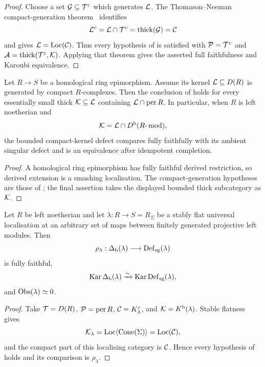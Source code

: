 \begin{proof}
Choose a set \(\mathcal G\subseteq\mathcal T^c\) which generates \(\mathcal L\).  The Thomason--Neeman compact-generation theorem~\cite[Theorem~4.4.9]{Neeman01} identifies
\[
 \mathcal L^c=\mathcal L\cap\mathcal T^c=\operatorname{thick}(\mathcal G)=\mathcal C
\]
and gives \(\mathcal L=\operatorname{Loc}(\mathcal C)\).  Thus every hypothesis of  is satisfied with \(\mathcal P=\mathcal T^c\) and \(\mathcal A=\operatorname{thick}(\mathcal T^c,\mathcal K)\).  Applying that theorem gives the asserted full faithfulness and Karoubi equivalence.
\end{proof}

\begin{corollary}\label{cor:homological-epi-compact-kernel}
Let \(R\to S\) be a homological ring epimorphism.  Assume its kernel \(\mathcal L\subseteq D(R)\) is generated by compact \(R\)-complexes.  Then the conclusion of  holds for every essentially small thick \(\mathcal K\subseteq\mathcal L\) containing \(\mathcal L\cap\operatorname{per} R\).  In particular, when \(R\) is left noetherian and
\[
 \mathcal K=\mathcal L\cap D^{\mathrm b}(R\text{-}\operatorname{mod}),
\]
the bounded compact-kernel defect compares fully faithfully with its ambient singular defect and is an equivalence after idempotent completion.
\end{corollary}

\begin{proof}
A homological ring epimorphism has fully faithful derived restriction, so derived extension is a smashing localisation.  The compact-generation hypotheses are those of ; the final assertion takes the displayed bounded thick subcategory as \(\mathcal K\).
\end{proof}

\begin{theorem}\label{thm:unconditional-comparison}
Let \(R\) be left noetherian and let \(\lambda:R\to S=R_\Sigma\) be a stably flat universal localisation at an arbitrary set of maps between finitely generated projective left modules.  Then
\[
 \rho_\lambda:\Delta_{\mathrm b}(\lambda)\longrightarrow\operatorname{Def}_{\mathrm{sg}}(\lambda)
\]
is fully faithful,
\[
 \operatorname{Kar}\Delta_{\mathrm b}(\lambda)\xrightarrow{\sim}\operatorname{Kar}\operatorname{Def}_{\mathrm{sg}}(\lambda),
\]
and \(\operatorname{Obs}(\lambda)\simeq0\).
\end{theorem}

\begin{proof}
Take \(\mathcal T=D(R)\), \(\mathcal P=\operatorname{per} R\), \(\mathcal C=K^c_\lambda\), and \(\mathcal K=K^{\mathrm b}(\lambda)\).  Stable flatness gives
\[
 \mathcal K_\lambda=\operatorname{Loc}\langle\operatorname{Cone}(\Sigma)\rangle=\operatorname{Loc}(\mathcal C),
\]
and the compact part of this localising category is \(\mathcal C\).  Hence every hypothesis of  holds and its comparison is \(\rho_\lambda\).
\end{proof}


